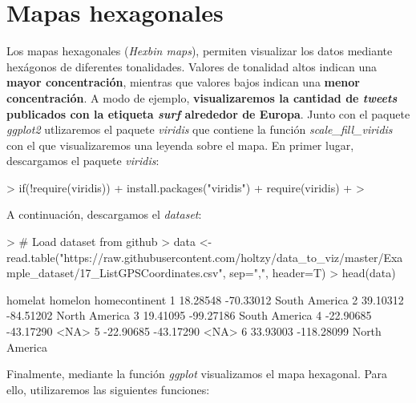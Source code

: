 \documentclass [a4paper] {article}
\begin{document}
\section{Mapas hexagonales}
Los mapas hexagonales (\textit{Hexbin maps}), permiten visualizar los datos mediante hexágonos de diferentes tonalidades. Valores de tonalidad altos indican una \textbf{mayor concentración}, mientras que valores bajos indican una \textbf{menor concentración}. A modo de ejemplo, \textbf{visualizaremos la cantidad de \textit{tweets} publicados con la etiqueta \textit{surf} alrededor de Europa}. Junto con el paquete \textit{ggplot2} utlizaremos el paquete \textit{viridis} que contiene la función \textit{scale\_fill\_viridis} con el que visualizaremos una leyenda sobre el mapa. En primer lugar, descargamos el paquete \textit{viridis}:
\begin{Schunk}
\begin{Sinput}
> if(!require(viridis)){
+   install.packages("viridis")
+   require(viridis)
+ }
> 
\end{Sinput}
\end{Schunk}
A continuación, descargamos el \textit{dataset}:
\begin{Schunk}
\begin{Sinput}
> # Load dataset from github
> data <- read.table("https://raw.githubusercontent.com/holtzy/data_to_viz/master/Example_dataset/17_ListGPSCoordinates.csv", sep=",", header=T)
> head(data)
\end{Sinput}
\begin{Soutput}
    homelat    homelon homecontinent
1  18.28548  -70.33012 South America
2  39.10312  -84.51202 North America
3  19.41095  -99.27186 South America
4 -22.90685  -43.17290          <NA>
5 -22.90685  -43.17290          <NA>
6  33.93003 -118.28099 North America
\end{Soutput}
\end{Schunk}
Finalmente, mediante la función \textit{ggplot} visualizamos el mapa hexagonal. Para ello, utilizaremos las siguientes funciones:
\end{document}
